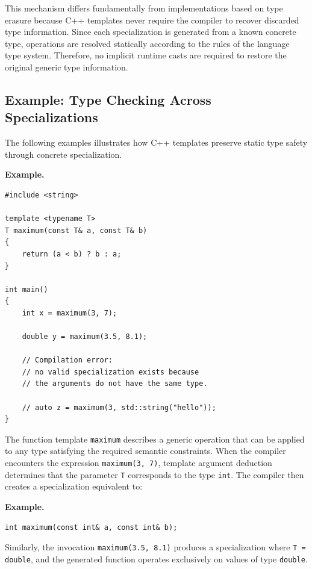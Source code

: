 \documentclass[11pt]{report}
\begin{document}
This mechanism differs fundamentally from implementations based on type
erasure because C++ templates never require the compiler to recover
discarded type information. Since each specialization is generated from a
known concrete type, operations are resolved statically according to the
rules of the language type system. Therefore, no implicit runtime casts are
required to restore the original generic type information.

\subsection{Example: Type Checking Across Specializations}
\label{CppTemplates:TypeSafety:Example}
The following examples illustrates how C++ templates preserve static type
safety through concrete specialization.

\begin{examplebox}
\textbf{Example.}


\begin{lstlisting}
#include <string>

template <typename T>
T maximum(const T& a, const T& b)
{
    return (a < b) ? b : a;
}

int main()
{
    int x = maximum(3, 7);

    double y = maximum(3.5, 8.1);

    // Compilation error:
    // no valid specialization exists because
    // the arguments do not have the same type.

    // auto z = maximum(3, std::string("hello"));
}
\end{lstlisting}
\end{examplebox}

The function template \texttt{maximum} describes a generic operation that
can be applied to any type satisfying the required semantic constraints.
When the compiler encounters the expression \texttt{maximum(3, 7)}, template
argument deduction determines that the parameter \texttt{T} corresponds to
the type \texttt{int}. The compiler then creates a specialization equivalent
to:

\begin{examplebox}
\textbf{Example.}

\begin{lstlisting}
int maximum(const int& a, const int& b);
\end{lstlisting}
\end{examplebox}

Similarly, the invocation \texttt{maximum(3.5, 8.1)} produces a
specialization where \texttt{T = double}, and the generated function
operates exclusively on values of type \texttt{double}.
\end{document}
